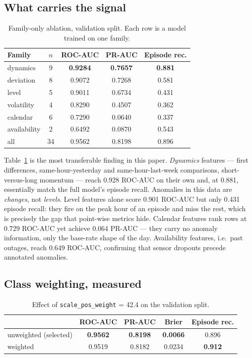 \documentclass[conference]{IEEEtran}
\begin{document}
\subsection{What carries the signal}

\begin{table}[t]
\centering
\caption{Family-only ablation, validation split. Each row is a model trained on one family.}
\label{tab:ablation}
\small
\begin{tabular}{lcccc}
\toprule
Family & $n$ & ROC-AUC & PR-AUC & Episode rec. \\
\midrule
dynamics & 9 & \textbf{0.9284} & \textbf{0.7657} & \textbf{0.881} \\
deviation & 8 & 0.9072 & 0.7268 & 0.581 \\
level & 5 & 0.9011 & 0.6734 & 0.431 \\
volatility & 4 & 0.8290 & 0.4507 & 0.362 \\
calendar & 6 & 0.7290 & 0.0640 & 0.337 \\
availability & 2 & 0.6492 & 0.0870 & 0.543 \\
\midrule
all & 34 & 0.9562 & 0.8198 & 0.896 \\
\bottomrule
\end{tabular}
\end{table}

Table~\ref{tab:ablation} is the most transferable finding in this paper. \emph{Dynamics} features ---
first differences, same-hour-yesterday and same-hour-last-week comparisons, short-versus-long
momentum --- reach 0.928 ROC-AUC on their own and, at 0.881, essentially match the full model's episode
recall. Anomalies in this data are \emph{changes}, not \emph{levels}. Level features alone score 0.901
ROC-AUC but only 0.431 episode recall: they fire on the peak hour of an episode and miss the rest,
which is precisely the gap that point-wise metrics hide. Calendar features rank rows at 0.729 ROC-AUC
yet achieve 0.064 PR-AUC --- they carry no anomaly information, only the base-rate shape of the day.
Availability features, i.e.\ past outages, reach 0.649 ROC-AUC, confirming that sensor dropouts precede
annotated anomalies.

\subsection{Class weighting, measured}

\begin{table}[t]
\centering
\caption{Effect of \texttt{scale\_pos\_weight} = 42.4 on the validation split.}
\label{tab:weight}
\footnotesize
\setlength{\tabcolsep}{4pt}
\begin{tabular}{lcccc}
\toprule
 & ROC-AUC & PR-AUC & Brier & Episode rec. \\
\midrule
unweighted (selected) & \textbf{0.9562} & \textbf{0.8198} & \textbf{0.0066} & 0.896 \\
weighted & 0.9519 & 0.8182 & 0.0234 & \textbf{0.912} \\
\bottomrule
\end{tabular}
\end{table}
\end{document}

